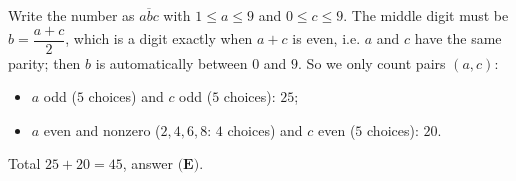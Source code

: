 Write the number as $\overline{abc}$ with $1\le a\le9$ and $0\le c\le9$. The middle digit must be $b=\dfrac{a+c}{2}$, which is a digit exactly when $a+c$ is even, i.e. $a$ and $c$ have the same parity; then $b$ is automatically between $0$ and $9$. So we only count pairs $(a,c)$:
\begin{itemize}
\item $a$ odd ($5$ choices) and $c$ odd ($5$ choices): $25$;
\item $a$ even and nonzero ($2,4,6,8$: $4$ choices) and $c$ even ($5$ choices): $20$.
\end{itemize}
Total $25+20=\boxed{45}$, answer $\textbf{(E)}$.
